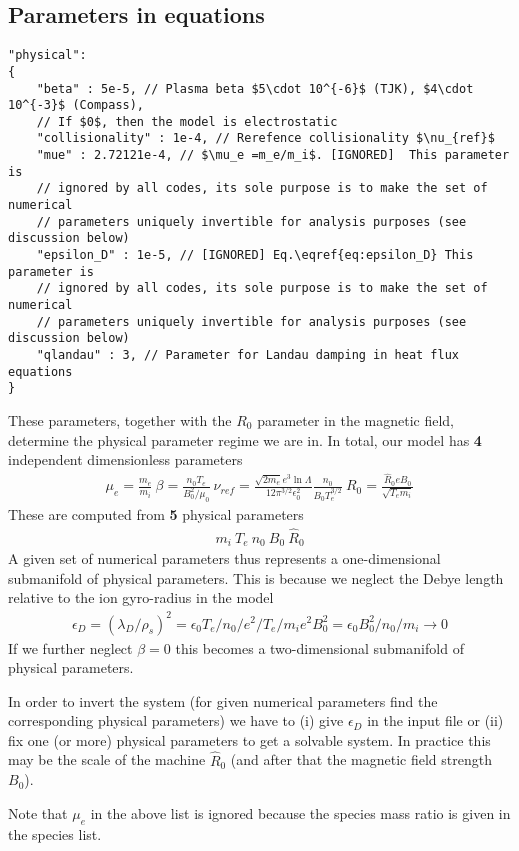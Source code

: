 \subsection{Parameters in equations} \label{sec:physical}
\begin{verbatim}
"physical":
{
    "beta" : 5e-5, // Plasma beta $5\cdot 10^{-6}$ (TJK), $4\cdot 10^{-3}$ (Compass),
    // If $0$, then the model is electrostatic
    "collisionality" : 1e-4, // Rerefence collisionality $\nu_{ref}$
    "mue" : 2.72121e-4, // $\mu_e =m_e/m_i$. [IGNORED]  This parameter is
    // ignored by all codes, its sole purpose is to make the set of numerical
    // parameters uniquely invertible for analysis purposes (see discussion below)
    "epsilon_D" : 1e-5, // [IGNORED] Eq.\eqref{eq:epsilon_D} This parameter is
    // ignored by all codes, its sole purpose is to make the set of numerical
    // parameters uniquely invertible for analysis purposes (see discussion below)
    "qlandau" : 3, // Parameter for Landau damping in heat flux equations
}
\end{verbatim}
These parameters, together with the $R_0$ parameter in the magnetic field,
determine the physical parameter regime we are in.
In total, our model has \textbf{4} independent dimensionless parameters
\begin{align*}
    \mu_e = \frac{m_e}{m_i}\ \beta =
    \frac{n_0T_{e}}{B_0^2/\mu_0}\ \nu_{ref} = \frac{\sqrt{2m_e} e^3 \ln
    \Lambda} {12\pi^{3/2} \epsilon_0^2} \frac{n_0} {B_0T_e^{3/2}} \ R_0
    = \frac{\hat R_0 e B_0}{\sqrt{T_{e}m_i}}
\end{align*}
These are computed from \textbf{5} physical parameters
\begin{align*}
    m_i\ T_e\ n_0\ B_0\ \hat R_0
\end{align*}
 A given set of numerical parameters thus represents a one-dimensional
 submanifold of physical parameters.
 This is because we neglect the Debye length relative to the ion gyro-radius
 in the model
 \begin{align}\label{eq:epsilon_D}
     \epsilon_D = (\lambda_D/\rho_s)^2 = \epsilon_0 T_e /n_0 /e^2 / T_e/m_i e^2 B_0^2 = \epsilon_0 B_0^2/n_0 /m_i \rightarrow 0
 \end{align}
If we further neglect $\beta=0$ this becomes a two-dimensional submanifold
of physical parameters.
\begin{tcolorbox}[title=Note]
    In order to invert the system (for given numerical parameters find the
    corresponding physical parameters) we have to (i) give $\epsilon_D$ in the
    input file or (ii) fix one (or more) physical
    parameters to get a solvable system.  In practice this may be the scale of
    the machine $\hat R_0$ (and after that the magnetic field strength $B_0$).

    Note that $\mu_e$ in the above list is ignored because the species mass ratio is given
    in the species list.
\end{tcolorbox}
